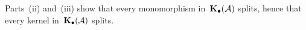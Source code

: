\subsection{}

Parts~(ii) and~(iii) show that every monomorphism in~$\mathbf{K}_\bullet(\mathcal{A})$ splits, hence that every kernel in~$\mathbf{K}_\bullet(\mathcal{A})$ splits.





